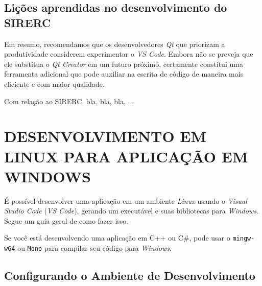 \documentclass[a4paper,11pt]{article}
\newcommand{\sistema}{\textsf{SIRERC}}
\newcommand{\qtcreator}{\textit{Qt Creator}}
\newcommand{\qt}{\textit{Qt}}
\newcommand{\vscode}{\textit{VS Code}}
\newcommand{\windows}{\textit{Windows}}
\newcommand{\linux}{\textit{Linux}}
\begin{document}
\subsection{Lições aprendidas no desenvolvimento do \sistema{}}

Em resumo, recomendamos que os desenvolvedores \qt{} que priorizam a produtividade considerem experimentar o \vscode{}. Embora não se preveja que ele substitua o \qtcreator{} em um futuro próximo, certamente constitui uma ferramenta adicional que pode auxiliar na escrita de código de maneira mais eficiente e com maior qualidade.

Com relação ao \sistema{}, bla, bla, bla, ...


\section{DESENVOLVIMENTO EM LINUX PARA APLICAÇÃO EM WINDOWS}

É possível desenvolver uma aplicação em um ambiente \linux{} usando o \textit{Visual Studio Code} (\vscode{}), gerando um executável e suas bibliotecas para \windows{}. Segue um guia geral de como fazer isso.

Se você está desenvolvendo uma aplicação em C++ ou C\#, pode usar o \texttt{mingw-w64} ou \texttt{Mono} para compilar seu código para \windows{}.

\subsection{Configurando o Ambiente de Desenvolvimento}
\end{document}
